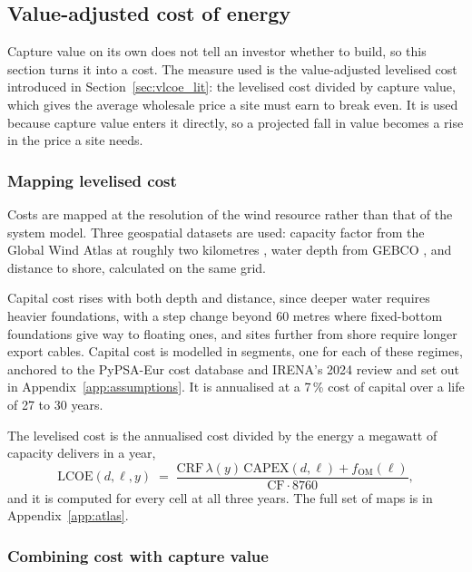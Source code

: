 \subsection{Value-adjusted cost of energy}
\label{sec:vlcoe_method}

Capture value on its own does not tell an investor whether to build, so this
section turns it into a cost. The measure used is the value-adjusted levelised
cost introduced in Section~\ref{sec:vlcoe_lit}: the levelised cost divided by
capture value, which gives the average wholesale price a site must earn to break
even. It is used because capture value enters it directly, so a projected
fall in value becomes a rise in the price a site needs.

\subsubsection{Mapping levelised cost}\label{sec:cost_field}

Costs are mapped at the resolution of the wind resource rather than that of the
system model. Three geospatial datasets are used: capacity factor from the
Global Wind Atlas at roughly two kilometres \cite{GlobalWindAtlas}, water depth
from GEBCO \cite{GEBCO2014}, and distance to shore, calculated on the same grid.

Capital cost rises with both depth and distance, since deeper water requires heavier
foundations, with a step change beyond 60 metres where fixed-bottom foundations
give way to floating ones, and sites further from shore require longer export
cables. Capital cost is modelled in segments, one for each of these
regimes, anchored to the PyPSA-Eur cost database and IRENA's 2024 review
\cite{Horsch2018, IRENA2025Costs} and set out in
Appendix~\ref{app:assumptions}. It is annualised at a 7\,\% cost of capital over
a life of 27 to 30 years.

The levelised cost is the annualised cost divided by the energy a megawatt of
capacity delivers in a year,
%
\begin{equation}
  \mathrm{LCOE}(d,\ell,y) \;=\;
  \frac{\mathrm{CRF}\,\lambda(y)\,\mathrm{CAPEX}(d,\ell) + f_{\mathrm{OM}}(\ell)}
       {\mathrm{CF}\cdot 8760},
  \label{eq:lcoe}
\end{equation}
%
and it is computed for every cell at all three years. The full set of maps is in
Appendix~\ref{app:atlas}.

\subsubsection{Combining cost with capture value}\label{sec:vlcoe_def}

